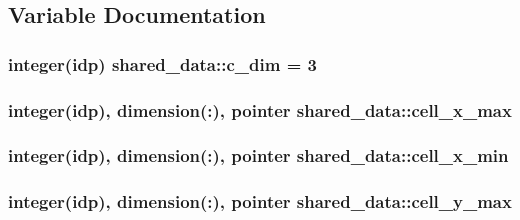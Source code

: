\subsection{Variable Documentation}
\subsubsection[{\texorpdfstring{c\+\_\+dim}{c_dim}}]{\setlength{\rightskip}{0pt plus 5cm}integer(idp) shared\+\_\+data\+::c\+\_\+dim = 3}\hypertarget{namespaceshared__data_a9dcd30bdab987f8957482cbd80ba40b3}{}\label{namespaceshared__data_a9dcd30bdab987f8957482cbd80ba40b3}
\subsubsection[{\texorpdfstring{cell\+\_\+x\+\_\+max}{cell_x_max}}]{\setlength{\rightskip}{0pt plus 5cm}integer(idp), dimension(\+:), pointer shared\+\_\+data\+::cell\+\_\+x\+\_\+max}\hypertarget{namespaceshared__data_a560a198cff32066380eaf1263719724d}{}\label{namespaceshared__data_a560a198cff32066380eaf1263719724d}
\subsubsection[{\texorpdfstring{cell\+\_\+x\+\_\+min}{cell_x_min}}]{\setlength{\rightskip}{0pt plus 5cm}integer(idp), dimension(\+:), pointer shared\+\_\+data\+::cell\+\_\+x\+\_\+min}\hypertarget{namespaceshared__data_a2bcdae01850fe7a172972cd09651522b}{}\label{namespaceshared__data_a2bcdae01850fe7a172972cd09651522b}
\subsubsection[{\texorpdfstring{cell\+\_\+y\+\_\+max}{cell_y_max}}]{\setlength{\rightskip}{0pt plus 5cm}integer(idp), dimension(\+:), pointer shared\+\_\+data\+::cell\+\_\+y\+\_\+max}\hypertarget{namespaceshared__data_af3b3d41c5b4d46127faa634d5ad58df2}{}\label{namespaceshared__data_af3b3d41c5b4d46127faa634d5ad58df2}
